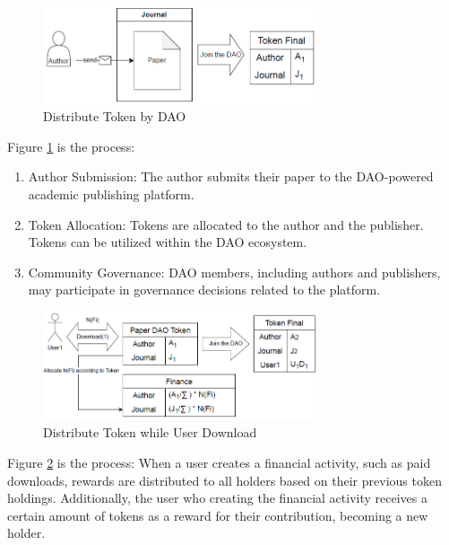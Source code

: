 \documentclass[lettersize,journal]{IEEEtran}
\begin{document}
\begin{figure}[h]
  \centering
  \includegraphics[width=3.2in]{assets/daopaper.png}
  \caption{Distribute Token by DAO}
  \label{fig:distributetoken}
\end{figure}

Figure \ref{fig:distributetoken} is the process:

\begin{enumerate}
  \item Author Submission: The author submits their paper to the DAO-powered academic publishing platform.
  \item Token Allocation: Tokens are allocated to the author and the publisher. Tokens can be utilized within the DAO ecosystem. 
  \item Community Governance: DAO members, including authors and publishers, may participate in governance decisions related to the platform. 
\end{enumerate}


\begin{figure}[h]
  \centering
  \includegraphics[width=3.2in]{assets/download1.png}
  \caption{Distribute Token while User Download}
  \label{fig:financetoken}
\end{figure}

Figure \ref{fig:financetoken} is the process: When a user creates a financial activity, such as paid downloads, rewards are distributed to all holders based on their previous token holdings. Additionally, the user who creating the financial activity receives a certain amount of tokens as a reward for their contribution, becoming a new holder.
\end{document}
